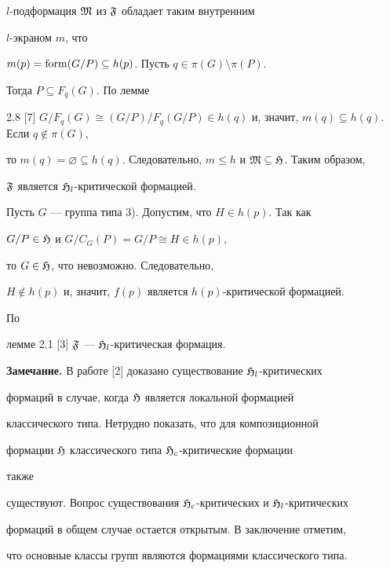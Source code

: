 \begin{pf}
$l$-подформация $\frak M$ из $\frak F$ обладает таким внутренним 


$l$-экраном $m$, что 


$m(p)=\operatorname{form}(G/P)\subseteq h(p)$. Пусть $q\in\pi(G)\setminus\pi(P)$. 


Тогда $P\subseteq F_q(G)$. По лемме 


2.8 [7] $G/F_q(G)\cong(G/P)/F_q(G/P)\in h(q)$ и, значит, $m(q)\subseteq 


h(q)$. Если $q\notin\pi(G)$, 


то $m(q)=\varnothing\subseteq h(q)$. Следовательно, $m\le h$ и $\frak 


M\subseteq\frak H$. Таким образом, 


$\frak F$ является $\frak H_l$-критической формацией. 


Пусть $G$ --- группа типа 3). Допустим, что $H\in h(p)$. Так как 


$G/P\in\frak H$ и $G/C_G(P)=G/P\cong H\in h(p)$, 


то $G\in\frak H$, что невозможно. Следовательно, 


$H\notin h(p)$ и, значит, $f(p)$ является $h(p)$-критической формацией. 


По 


лемме 2.1 [3] $\frak F$ --- $\frak H_l$-критическая формация. 


\end{pf} 


 


{\bf Замечание.} В работе [2] доказано существование $\frak 


H_l$-критических 


формаций в случае, когда $\frak H$ является локальной формацией 


классического типа. Нетрудно показать, что для композиционной 


формации $\frak H$ классического типа $\frak H_c$-критические формации 


также 


существуют. Вопрос существования $\frak H_c$-критических и $\frak 


H_l$-критических 


формаций в общем случае остается открытым. В заключение отметим, 


что основные классы групп являются формациями классического типа. 


 


